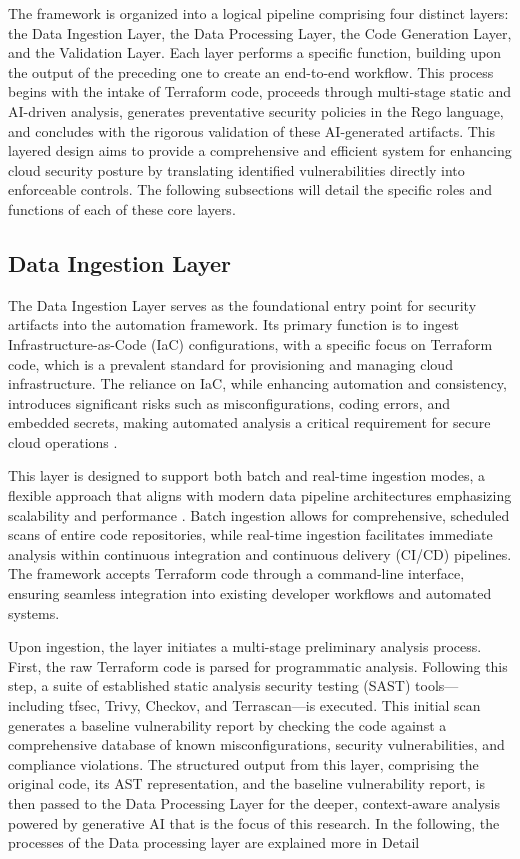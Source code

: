 The framework is organized into a logical pipeline comprising four distinct layers: the Data Ingestion Layer, the Data Processing Layer, the Code Generation Layer, and the Validation Layer. Each layer performs a specific function, building upon the output of the preceding one to create an end-to-end workflow. This process begins with the intake of Terraform code, proceeds through multi-stage static and AI-driven analysis, generates preventative security policies in the Rego language, and concludes with the rigorous validation of these AI-generated artifacts. This layered design aims to provide a comprehensive and efficient system for enhancing cloud security posture by translating identified vulnerabilities directly into enforceable controls. The following subsections will detail the specific roles and functions of each of these core layers.

\subsection{Data Ingestion Layer} %
\label{sec:Data Ingestion Layer}

The Data Ingestion Layer serves as the foundational entry point for security artifacts into the automation framework. Its primary function is to ingest Infrastructure-as-Code (IaC) configurations, with a specific focus on Terraform code, which is a prevalent standard for provisioning and managing cloud infrastructure. The reliance on IaC, while enhancing automation and consistency, introduces significant risks such as misconfigurations, coding errors, and embedded secrets, making automated analysis a critical requirement for secure cloud operations \cite{hayagreevan_security_2024}.

This layer is designed to support both batch and real-time ingestion modes, a flexible approach that aligns with modern data pipeline architectures emphasizing scalability and performance \cite{ismail_big_2025}. Batch ingestion allows for comprehensive, scheduled scans of entire code repositories, while real-time ingestion facilitates immediate analysis within continuous integration and continuous delivery (CI/CD) pipelines. The framework accepts Terraform code through a command-line interface, ensuring seamless integration into existing developer workflows and automated systems.

Upon ingestion, the layer initiates a multi-stage preliminary analysis process. First, the raw Terraform code is parsed for programmatic analysis. Following this step, a suite of established static analysis security testing (SAST) tools—including tfsec, Trivy, Checkov, and Terrascan—is executed. This initial scan generates a baseline vulnerability report by checking the code against a comprehensive database of known misconfigurations, security vulnerabilities, and compliance violations. The structured output from this layer, comprising the original code, its AST representation, and the baseline vulnerability report, is then passed to the Data Processing Layer for the deeper, context-aware analysis powered by generative AI that is the focus of this research. In the following, the processes of the Data processing layer are explained more in Detail

